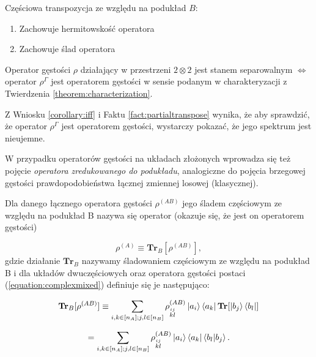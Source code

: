 \begin{fact}
    \label{fact:partialtranspose}
    Częściowa transpozycja ze względu na podukład $B$:

    \begin{enumerate}
        \item Zachowuje hermitowskość operatora
        \item Zachowuje ślad operatora
    \end{enumerate}
\end{fact}

\begin{theorem}
    \label{theorem:ppt}
    Operator gęstości $\rho$ działający w przestrzeni $2 \otimes 2$ jest stanem separowalnym $\Longleftrightarrow$ operator $\rho ^ {\Gamma}$ jest operatorem gęstości w sensie podanym w charakteryzacji z Twierdzenia \ref{theorem:characterization}.
\end{theorem}

\begin{fact}
    Z Wniosku \ref{corollary:iff} i Faktu \ref{fact:partialtranspose} wynika, że aby sprawdzić, że operator $\rho ^ {\Gamma}$ jest operatorem gęstości, wystarczy pokazać, że jego spektrum jest nieujemne.
\end{fact}

W przypadku operatorów gęstości na układach złożonych wprowadza się też pojęcie \textit{operatora zredukowanego do podukładu}, analogiczne do pojęcia brzegowej gęstości prawdopodobieństwa łącznej zmiennej losowej (klasycznej).

\begin{definition}
    Dla danego łącznego operatora gęstości $\rho ^ {(AB)}$ jego śladem częściowym ze względu na podukład B nazywa się operator (okazuje się, że jest on operatorem gęstości)

    \begin{equation}
        \label{equation:partialtrace}
        \rho ^ {(A)} \equiv \textbf{Tr}_B[\rho ^ {(AB)}],
    \end{equation}
    gdzie działanie $\textbf{Tr}_B$ nazywamy śladowaniem częściowym ze względu na podukład B i dla układów dwuczęściowych oraz operatora gęstości postaci (\ref{equation:complexmixed}) definiuje się je następująco:

    $$
        \textbf{Tr}_{B}[\rho ^ {(AB)}] \equiv \sum\limits_{i, k \in [n_{A}]; j, l \in [n_{B}]} \rho_{\stackrel{ij}{kl}} ^ {(AB)} \ket{a_{i}} \bra{a_{k}} \textbf{Tr}[\ket{b_{j}} \bra{b_{l}}]
    $$

    \begin{equation}
        \label{equation:partial}
        = \sum\limits_{i, k \in [n_{A}]; j, l \in [n_{B}]} \rho_{\stackrel{ij}{kl}} ^ {(AB)} \ket{a_{i}} \bra{a_{k}} \bra{b_{l}}\ket{b_{j}}.
    \end{equation}
\end{definition}

